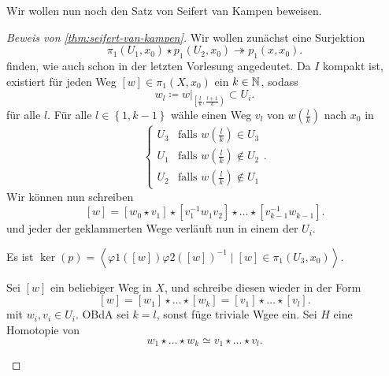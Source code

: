 Wir wollen nun noch den Satz von Seifert van Kampen beweisen.
\begin{proof}[Beweis von \autoref{thm:seifert-van-kampen}]
    Wir wollen zunächst eine Surjektion
    \[
        \pi_1(U_1,x_0) \star p_1(U_2,x_0) \twoheadrightarrow p_1(x,x_0)
    .\] 
    finden, wie auch schon in der letzten Vorlesung angedeutet. Da $I$ kompakt ist, existiert  für jeden Weg $[w] \in \pi_1(X,x_0)$ ein $k\in \mathbb{N}$, sodass
    \[
w_l \coloneqq         w|_{\left[ \frac{l}{k}, \frac{l+1}{k} \right) } \subset U_i
    .\] 
    für alle $l$. Für alle  $l\in \left \{1,k-1\right\}$ wähle einen Weg $v_l$ von  $w\left( \frac{l}{k} \right) $ nach $x_0$ in 
    \[
    \begin{cases}
        U_3 & \text{falls } w\left( \frac{l}{k} \right) \in U_3 \\
        U_1 & \text{falls } w\left( \frac{l}{k} \right) \not\in U_2 \\
        U_2 & \text{falls } w\left( \frac{l}{k} \right)  \not\in U_1
    \end{cases}
    .\] 
    Wir können nun schreiben
    \[
        [w] = [w_0\star v_1] \star [v_1^{-1} w_1 v_2] \star \ldots \star [v_{k-1}^{-1}w_{k-1}]
    .\] 
    und jeder der geklammerten Wege verläuft nun in einem der $U_i$.
\begin{claim}
    Es ist $\ker(p) = \left< \varphi 1([w])\varphi 2([w])^{-1} \mid  [w] \in \pi_1(U_3,x_0) \right> $.
\end{claim}
\begin{subproof}
    Sei $[w]$ ein beliebiger Weg in  $X$, und schreibe diesen wieder in der Form
     \[
         [w] = [w_1] \star \ldots \star [w_k] = [v_1] \star \ldots \star [v_l]
    .\] 
    mit $w_i, v_i \in U_i$. OBdA sei $k=l$, sonst füge triviale Wgee ein. Sei  $H$ eine Homotopie von 
     \[
    w_1 \star \ldots \star w_k \simeq v_1 \star \ldots \star v_l
    .\] 
\end{subproof}
\end{proof}
